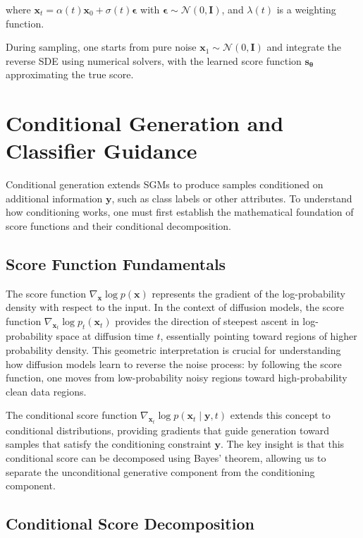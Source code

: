 where $\mathbf{x}_t = \alpha(t)\mathbf{x}_0 + \sigma(t)\boldsymbol{\epsilon}$ with $\boldsymbol{\epsilon} \sim \mathcal{N}(0, \mathbf{I})$, and $\lambda(t)$ is a weighting function.

During sampling, one starts from pure noise $\mathbf{x}_1 \sim \mathcal{N}(0, \mathbf{I})$ and integrate the reverse SDE using numerical solvers, with the learned score function $\mathbf{s}_{\boldsymbol{\theta}}$ approximating the true score.

\section{Conditional Generation and Classifier Guidance}

Conditional generation extends SGMs to produce samples conditioned on additional information $\mathbf{y}$, such as class labels or other attributes. To understand how conditioning works, one must first establish the mathematical foundation of score functions and their conditional decomposition.

\subsection{Score Function Fundamentals}

The score function $\nabla_{\mathbf{x}} \log p(\mathbf{x})$ represents the gradient of the log-probability density with respect to the input. In the context of diffusion models, the score function $\nabla_{\mathbf{x}_t} \log p_t(\mathbf{x}_t)$ provides the direction of steepest ascent in log-probability space at diffusion time $t$, essentially pointing toward regions of higher probability density. This geometric interpretation is crucial for understanding how diffusion models learn to reverse the noise process: by following the score function, one moves from low-probability noisy regions toward high-probability clean data regions.

The conditional score function $\nabla_{\mathbf{x}_t} \log p(\mathbf{x}_t \mid \mathbf{y}, t)$ extends this concept to conditional distributions, providing gradients that guide generation toward samples that satisfy the conditioning constraint $\mathbf{y}$. The key insight is that this conditional score can be decomposed using Bayes' theorem, allowing us to separate the unconditional generative component from the conditioning component.

\subsection{Conditional Score Decomposition}

